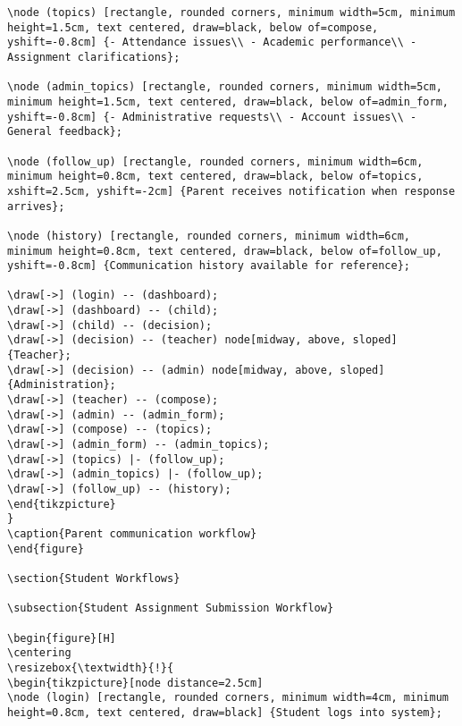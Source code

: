 \documentclass[11pt]{report}
\begin{document}
\begin{verbatim}
\node (topics) [rectangle, rounded corners, minimum width=5cm, minimum height=1.5cm, text centered, draw=black, below of=compose, yshift=-0.8cm] {- Attendance issues\\ - Academic performance\\ - Assignment clarifications};

\node (admin_topics) [rectangle, rounded corners, minimum width=5cm, minimum height=1.5cm, text centered, draw=black, below of=admin_form, yshift=-0.8cm] {- Administrative requests\\ - Account issues\\ - General feedback};

\node (follow_up) [rectangle, rounded corners, minimum width=6cm, minimum height=0.8cm, text centered, draw=black, below of=topics, xshift=2.5cm, yshift=-2cm] {Parent receives notification when response arrives};

\node (history) [rectangle, rounded corners, minimum width=6cm, minimum height=0.8cm, text centered, draw=black, below of=follow_up, yshift=-0.8cm] {Communication history available for reference};

\draw[->] (login) -- (dashboard);
\draw[->] (dashboard) -- (child);
\draw[->] (child) -- (decision);
\draw[->] (decision) -- (teacher) node[midway, above, sloped] {Teacher};
\draw[->] (decision) -- (admin) node[midway, above, sloped] {Administration};
\draw[->] (teacher) -- (compose);
\draw[->] (admin) -- (admin_form);
\draw[->] (compose) -- (topics);
\draw[->] (admin_form) -- (admin_topics);
\draw[->] (topics) |- (follow_up);
\draw[->] (admin_topics) |- (follow_up);
\draw[->] (follow_up) -- (history);
\end{tikzpicture}
}
\caption{Parent communication workflow}
\end{figure}

\section{Student Workflows}

\subsection{Student Assignment Submission Workflow}

\begin{figure}[H]
\centering
\resizebox{\textwidth}{!}{
\begin{tikzpicture}[node distance=2.5cm]
\node (login) [rectangle, rounded corners, minimum width=4cm, minimum height=0.8cm, text centered, draw=black] {Student logs into system};


\end{verbatim}
\end{document}
